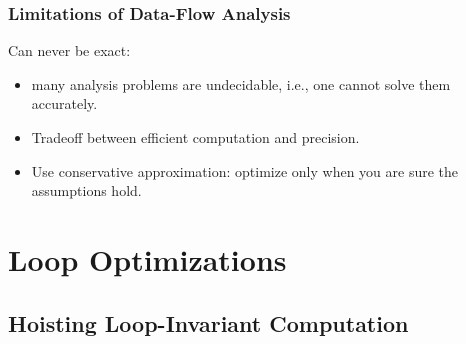 \documentclass{beamer}
\begin{document}
\begin{frame}
\frametitle{Limitations of Data-Flow Analysis}

\bigskip

Can never be exact:\smallskip

\begin{itemize}

\item many analysis problems are undecidable, i.e., one cannot solve
        them accurately.

\item Tradeoff between efficient computation and precision.

\item Use conservative approximation: optimize only when you are sure
        the assumptions hold.

\end{itemize}

\end{frame}





\section{Loop Optimizations}

\begin{frame}[fragile]
    \tableofcontents[currentsection]
\end{frame}

\subsection{Hoisting Loop-Invariant Computation}
\end{document}
